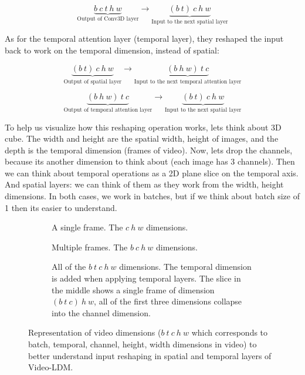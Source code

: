 \[ \underbrace{b\ c\ t\ h\ w}_{\text{Output of Conv3D layer}} \rightarrow \underbrace{(b\ t)\ c\ h\ w}_{\text{Input to the next spatial layer}} \]

As for the temporal attention layer (temporal layer), they reshaped the input back to work on the temporal dimension, instead of spatial:

\[ \underbrace{(b\ t)\ c\ h\ w}_{\text{Output of spatial layer}} \rightarrow \underbrace{(b\ h\ w) \ t\ c}_{\text{Input to the next temporal attention layer}} \]

\[ \underbrace{(b\ h\ w) \ t\ c}_{\text{Output of temporal attention layer}} \rightarrow \underbrace{(b\ t)\ c\ h\ w}_{\text{Input to the next spatial layer}} \]

To help us visualize how this reshaping operation works, lets think about 3D cube. The width and height are the spatial width, height of images, and the depth is the temporal dimension (frames of video). Now, lets drop the channels, because its another dimension to think about (each image has 3 channels). Then we can think about temporal operations as a 2D plane slice on the temporal axis. And spatial layers: we can think of them as they work from the width, height dimensions. In both cases, we work in batches, but if we think about batch size of 1 then its easier to understand.

\begin{figure}
    \centering

    \begin{subfigure}{1\textwidth}
        \centering
        \scalebox{0.7}{
            
        }
        \caption{A single frame. The $c\ h\ w$ dimensions.}
    \end{subfigure}


    \hfill


    \begin{subfigure}{1\textwidth}
        \centering
        \scalebox{0.7}{
            
        }
        \caption{Multiple frames. The $b\ c\ h\ w$ dimensions.}
    \end{subfigure}

    \hfill

    \begin{subfigure}[t]{1\textwidth}
        \centering
        \scalebox{0.7}{
            
        }
        \caption{All of the $b\ t\ c\ h\ w$ dimensions. The temporal dimension is added when applying temporal layers. The slice in the middle shows a single frame of dimension $(b\ t\ c)\ h\ w$, all of the first three dimensions collapse into the channel dimension.}
    \end{subfigure}

    \caption{Representation of video dimensions ($b\ t\ c\ h\ w$ which corresponds to batch, temporal, channel, height, width dimensions in video) to better understand input reshaping in spatial and temporal layers of Video-LDM.}
\end{figure}





